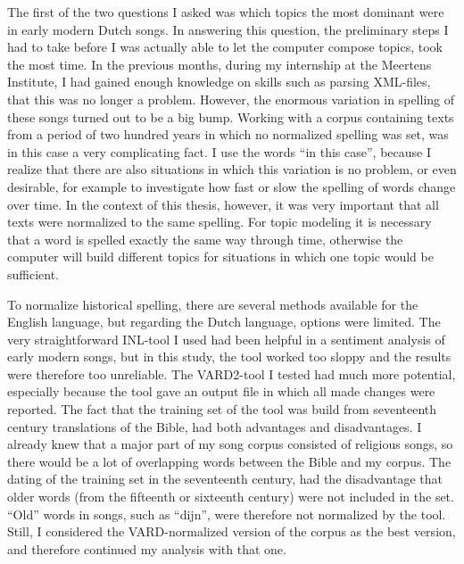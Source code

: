 The first of the two questions I asked was which topics the most dominant were in early modern Dutch songs. In answering this question, the preliminary steps I had to take before I was actually able to let the computer compose topics, took the most time. In the previous months, during my internship at the Meertens Institute, I had gained enough knowledge on skills such as parsing XML-files, that this was no longer a problem. However, the enormous variation in spelling of these songs turned out to be a big bump. Working with a corpus containing texts from a period of two hundred years in which no normalized spelling was set, was in this case a very complicating fact. I use the words \enquote{in this case}, because I realize that there are also situations in which this variation is no problem, or even desirable, for example to investigate how fast or slow the spelling of words change over time. In the context of this thesis, however, it was very important that all texts were normalized to the same spelling. For topic modeling it is necessary that a word is spelled exactly the same way through time, otherwise the computer will build different topics for situations in which one topic would be sufficient.

To normalize historical spelling, there are several methods available for the English language, but regarding the Dutch language, options were limited. The very straightforward INL-tool I used had been helpful in a sentiment analysis of early modern songs, but in this study, the tool worked too sloppy and the results were therefore too unreliable. The VARD2-tool I tested had much more potential, especially because the tool gave an output file in which all made changes were reported. The fact that the training set of the tool was build from seventeenth century translations of the Bible, had both advantages and disadvantages. I already knew that a major part of my song corpus consisted of religious songs, so there would be a lot of overlapping words between the Bible and my corpus. The dating of the training set in the seventeenth century, had the disadvantage that older words (from the fifteenth or sixteenth century) were not included in the set. \enquote{Old} words in songs, such as \enquote{dijn}, were therefore not normalized by the tool. Still, I considered the VARD-normalized version of the corpus as the best version, and therefore continued my analysis with that one.

